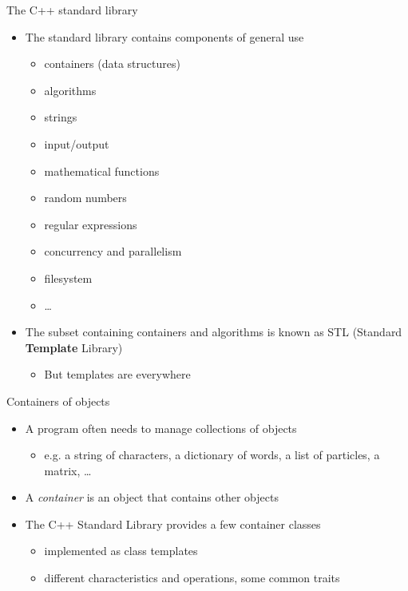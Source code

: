 \begin{frame}{The C++ standard library}

  \begin{itemize}
  \item The standard library contains components of general use
    \begin{itemize}
    \item \alert<2>{containers (data structures)}
    \item \alert<2>{algorithms}
    \item strings
    \item input/output
    \item mathematical functions
    \item random numbers
    \item regular expressions
    \item concurrency and parallelism
    \item filesystem
    \item \ldots
    \end{itemize}

  \item<2-> The subset containing containers and algorithms is known as STL
    (Standard \alert{\textbf{Template}} Library)
    \begin{itemize}
    \item But templates are everywhere
    \end{itemize}
  \end{itemize}

\end{frame}

\begin{frame}{Containers of objects}
  \begin{itemize}
  \item A program often needs to manage collections of objects
    \begin{itemize}
    \item e.g. a string of characters, a dictionary of words, a list of
      particles, a matrix, \ldots
    \end{itemize}
  \item<2-> A \textit{container} is an object that contains other objects
  \item<2-> The C++ Standard Library provides a few container classes
    \begin{itemize}[<.->]
    \item implemented as class templates
    \item different characteristics and operations, some common traits
    \end{itemize}
  \end{itemize}
\end{frame}

